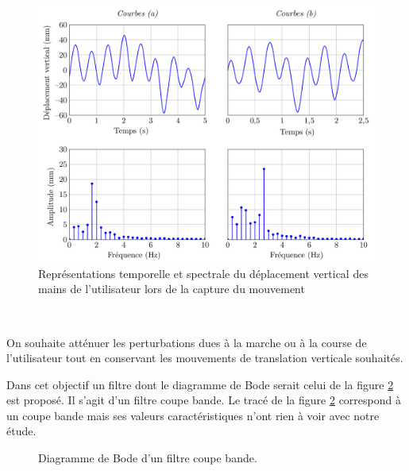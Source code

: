 \begin{figure}[ht!]
\begin{center}
 \includegraphics[width=0.7\linewidth]{img/fig03}
\end{center}
\caption{Représentations temporelle et spectrale du déplacement vertical des mains de l'utilisateur lors de la capture du mouvement}
\label{fig03}
\end{figure}

\vspace{-1cm}


~\

On souhaite atténuer les perturbations dues à la marche ou à la course de l'utilisateur tout en conservant les mouvements de translation verticale souhaités.

Dans cet objectif un filtre dont le diagramme de Bode serait celui de la figure \ref{fig04} est proposé. Il s'agit d'un filtre coupe bande. Le tracé de la figure \ref{fig04} correspond à un coupe bande mais ses valeurs caractéristiques n'ont rien à voir avec notre étude.

\vspace{-0.5cm}

\begin{figure}[ht!]
\begin{center}
  \resizebox{0.6\textwidth}{!}{}
\end{center}
\caption{Diagramme de Bode d'un filtre coupe bande.}
\label{fig04}
\end{figure}

\vspace{-0.5cm}

